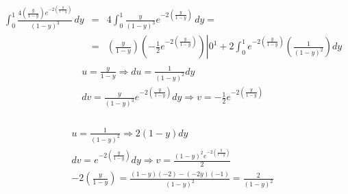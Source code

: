 \begin{Ejem}
\begin{eqnarray*}
\int_{0}^{1}\frac{4\left(\frac{y}{1-y}\right)e^{-2\left(\frac{y}{1-y}\right)}}{\left(1-y\right)^{3}}\, dy &=& 4\int_{0}^{1}\frac{y}{\left(1-y\right)^3}e^{-2\left(\frac{y}{1-y}\right)}\, dy =\\
&=& \left(\frac{y}{1-y}\right)\left(-\frac{1}{2}e^{-2\left(\frac{y}{1-y}\right)}\right)\left. \right|{0}^{1} + 2 \int_{0}^{1} e^{-2\left(\frac{y}{1-y}\right)}\left(\frac{1}{\left(1-y\right)^{2}}\right) dy
\end{eqnarray*}
\begin{eqnarray*}
\begin{array}{cc}
u=\frac{y}{1-y}\Rightarrow du=\frac{1}{\left(1-y\right)^{2}} dy\\
dv= \frac{y}{\left(1-y\right)^3}e^{-2\left(\frac{y}{1-y}\right)} dy \Rightarrow v=-\frac{1}{2}e^{-2\left(\frac{y}{1-y}\right)}\\
\end{array}
\end{eqnarray*}


\begin{eqnarray*}
u=\frac{1}{\left(1-y\right)^{2}} \Rightarrow 2\left(1-y\right)dy\\
dv= e^{-2\left(\frac{y}{1-y}\right)} dy \Rightarrow v= \frac{\left(1-y\right)^2 e^{-2\left(\frac{y}{1-y}\right)}}{2}\\
-2\left(\frac{y}{1-y}\right)=\frac{\left(1-y\right)\left(-2\right)-\left(-2y\right)\left(-1\right)}{\left(1-y\right)^2}= \frac{2}{\left(1-y\right)^2}\\
\end{eqnarray*}
\end{Ejem}

